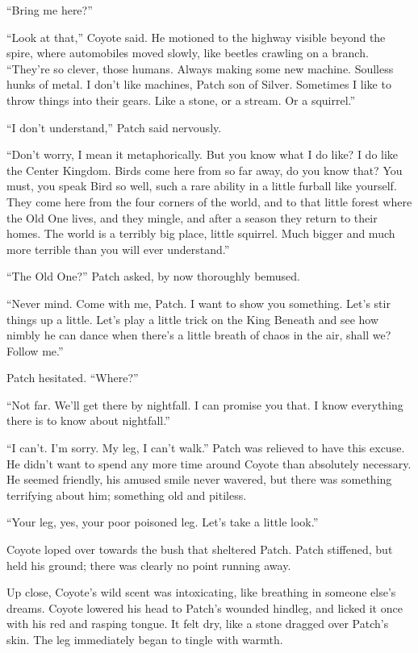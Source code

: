\documentclass[ebook,oneside,openany,12pt]{memoir}
\begin{document}
“Bring me here?”

“Look at that,” Coyote said. He motioned to the highway visible beyond
the spire, where automobiles moved slowly, like beetles crawling on a
branch. “They’re so clever, those humans. Always making some new
machine. Soulless hunks of metal. I don’t like machines, Patch son of
Silver. Sometimes I like to throw things into their gears. Like a
stone, or a stream. Or a squirrel.”

“I don’t understand,” Patch said nervously.

“Don’t worry, I mean it metaphorically. But you know what I do like?
I do like the Center Kingdom. Birds come here from so far away, do you
know that? You must, you speak Bird so well, such a rare ability in a
little furball like yourself. They come here from the four corners of
the world, and to that little forest where the Old One lives, and they
mingle, and after a season they return to their homes. The world is a
terribly big place, little squirrel. Much bigger and much more
terrible than you will ever understand.”

“The Old One?” Patch asked, by now thoroughly bemused.

“Never mind. Come with me, Patch. I want to show you something. Let’s
stir things up a little. Let’s play a little trick on the King Beneath
and see how nimbly he can dance when there’s a little breath of chaos
in the air, shall we? Follow me.”

Patch hesitated. “Where?”

“Not far. We’ll get there by nightfall. I can promise you that. I know
everything there is to know about nightfall.”

“I can’t. I’m sorry. My leg, I can’t walk.” Patch was relieved to have
this excuse. He didn’t want to spend any more time around Coyote than
absolutely necessary. He seemed friendly, his amused smile never
wavered, but there was something terrifying about him; something old
and pitiless.

“Your leg, yes, your poor poisoned leg. Let’s take a little look.”

Coyote loped over towards the bush that sheltered Patch. Patch
stiffened, but held his ground; there was clearly no point running
away.

Up close, Coyote’s wild scent was intoxicating, like breathing in
someone else’s dreams. Coyote lowered his head to Patch’s wounded
hindleg, and licked it once with his red and rasping tongue. It felt
dry, like a stone dragged over Patch’s skin. The leg immediately began
to tingle with warmth.
\end{document}
